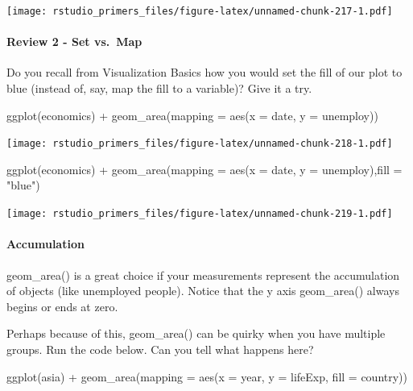 \documentclass[
]{article}
\newenvironment{Shaded}{\begin{snugshade}}{\end{snugshade}}
\newcommand{\AttributeTok}[1]{\textcolor[rgb]{0.77,0.63,0.00}{#1}}
\newcommand{\FunctionTok}[1]{\textcolor[rgb]{0.00,0.00,0.00}{#1}}
\newcommand{\NormalTok}[1]{#1}
\newcommand{\SpecialCharTok}[1]{\textcolor[rgb]{0.00,0.00,0.00}{#1}}
\newcommand{\StringTok}[1]{\textcolor[rgb]{0.31,0.60,0.02}{#1}}
\begin{document}
\texttt{[image: rstudio\_primers\_files/figure-latex/unnamed-chunk-217-1.pdf]}

\hypertarget{review-2---set-vs.-map}{%
\paragraph{Review 2 - Set vs.~Map}\label{review-2---set-vs.-map}}

Do you recall from Visualization Basics how you would set the fill of
our plot to blue (instead of, say, map the fill to a variable)? Give it
a try.

\begin{Shaded}
\begin{Highlighting}[]
\FunctionTok{ggplot}\NormalTok{(economics) }\SpecialCharTok{+}
  \FunctionTok{geom\_area}\NormalTok{(}\AttributeTok{mapping =} \FunctionTok{aes}\NormalTok{(}\AttributeTok{x =}\NormalTok{ date, }\AttributeTok{y =}\NormalTok{ unemploy))}
\end{Highlighting}
\end{Shaded}

\texttt{[image: rstudio\_primers\_files/figure-latex/unnamed-chunk-218-1.pdf]}

\begin{Shaded}
\begin{Highlighting}[]
\FunctionTok{ggplot}\NormalTok{(economics) }\SpecialCharTok{+}
  \FunctionTok{geom\_area}\NormalTok{(}\AttributeTok{mapping =} \FunctionTok{aes}\NormalTok{(}\AttributeTok{x =}\NormalTok{ date, }\AttributeTok{y =}\NormalTok{ unemploy),}\AttributeTok{fill =} \StringTok{"blue"}\NormalTok{)}
\end{Highlighting}
\end{Shaded}

\texttt{[image: rstudio\_primers\_files/figure-latex/unnamed-chunk-219-1.pdf]}

\hypertarget{accumulation}{%
\paragraph{Accumulation}\label{accumulation}}

geom\_area() is a great choice if your measurements represent the
accumulation of objects (like unemployed people). Notice that the y axis
geom\_area() always begins or ends at zero.

Perhaps because of this, geom\_area() can be quirky when you have
multiple groups. Run the code below. Can you tell what happens here?

\begin{Shaded}
\begin{Highlighting}[]
\FunctionTok{ggplot}\NormalTok{(asia) }\SpecialCharTok{+}
  \FunctionTok{geom\_area}\NormalTok{(}\AttributeTok{mapping =} \FunctionTok{aes}\NormalTok{(}\AttributeTok{x =}\NormalTok{ year, }\AttributeTok{y =}\NormalTok{ lifeExp, }\AttributeTok{fill =}\NormalTok{ country))}
\end{Highlighting}
\end{Shaded}
\end{document}
